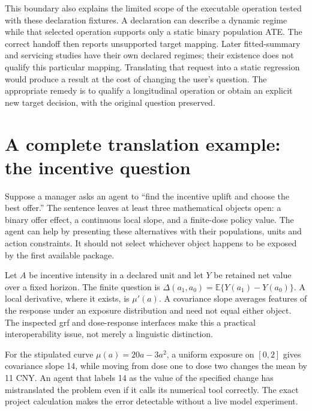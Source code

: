 This boundary also explains the limited scope of the executable operation
tested with these declaration fixtures. A declaration can describe a dynamic
regime while that selected operation supports only a static binary population
ATE. The correct handoff then reports unsupported target mapping. Later
fitted-summary and servicing studies have their own declared regimes; their
existence does not qualify this particular mapping. Translating that request into a
static regression would produce a result at the cost of changing the user's
question. The appropriate remedy is to qualify a longitudinal operation or
obtain an explicit new target decision, with the original question preserved.


\section{A complete translation example: the incentive question}
\label{v13:la-dose}

Suppose a manager asks an agent to ``find the incentive uplift and choose the
best offer.'' The sentence leaves at least three mathematical objects open:
a binary offer effect, a continuous local slope, and a finite-dose policy value.
The agent can help by presenting these alternatives with their populations,
units and action constraints. It should not select whichever object happens
to be exposed by the first available package.

Let $A$ be incentive intensity in a declared unit and let $Y$ be retained net
value over a fixed horizon. The finite question is
$\Delta(a_1,a_0)=\mathbb E\{Y(a_1)-Y(a_0)\}$. A local derivative, where it
exists, is $\mu'(a)$. A covariance slope averages features of the response
under an exposure distribution and need not equal either object. The inspected
grf and dose-response interfaces make this a practical interoperability issue,
not merely a linguistic distinction. \cite{v13_sw_grf,v13_sw_causaldrf}

For the stipulated curve $\mu(a)=20a-3a^2$, a uniform exposure on $[0,2]$
gives covariance slope 14, while moving from dose one to dose two changes the
mean by 11 CNY. An agent that labels 14 as the value of the specified change
has mistranslated the problem even if it calls its numerical tool correctly.
The exact project calculation makes the error detectable without a live model
experiment. \cite{v13_project_exact}

